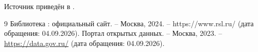 Источник приведён в \cite{site}.

\begin{thebibliography}{9}
   Библиотека : официальный сайт. – Москва, 2024. –
  https://www.rsl.ru/ (дата обращения: 04.09.2026). %
   Портал открытых данных. – Москва, 2023. –
  \url{https://data.gov.ru/} (дата обращения: 04.09.2026). %
\end{thebibliography}
